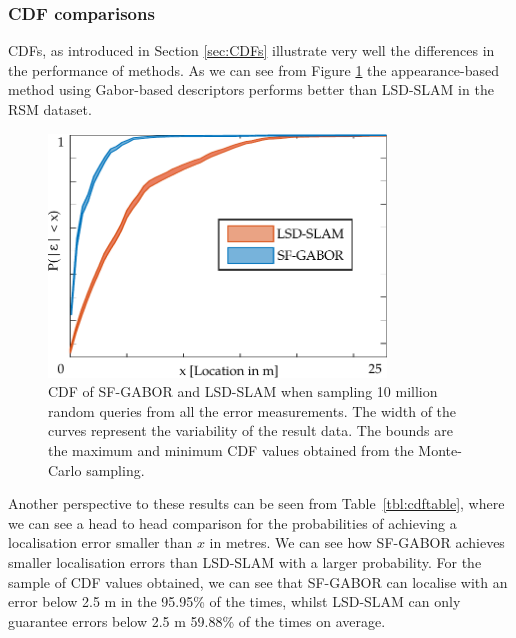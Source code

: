 \subsubsection{CDF comparisons}

CDFs, as introduced in Section \ref{sec:CDFs} illustrate very well the differences in the performance of methods. As we can see from Figure \ref{fig:cdf} the appearance-based method using Gabor-based descriptors performs better than LSD-SLAM in the RSM dataset. 

\begin{figure}
\centering
\includegraphics[width=0.8\textwidth]{gfx/Chapter04/SF_GABORvsLSD_SLAM.pdf}
\caption{CDF of SF-GABOR and LSD-SLAM when sampling 10 million random queries from all the error measurements. The width of the curves represent the variability of the result data. The bounds are the maximum and minimum CDF values obtained from the Monte-Carlo sampling.}
\label{fig:cdf}
\end{figure}

Another perspective to these results can be seen from Table~\ref{tbl:cdftable}, where we can see a head to head comparison for the probabilities of achieving a localisation error smaller than $x$ in metres. We can see how SF-GABOR achieves smaller localisation errors than LSD-SLAM with a larger probability. For the sample of CDF values obtained, we can see that SF-GABOR can localise with an error below 2.5 m in the 95.95\% of the times, whilst LSD-SLAM can only guarantee errors below 2.5 m 59.88\% of the times on average.


